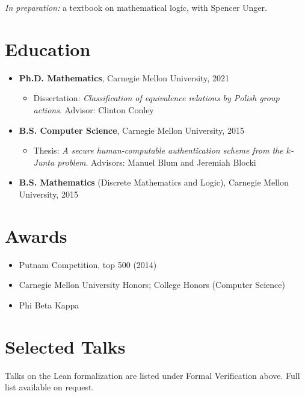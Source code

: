 \documentclass[letterpaper]{article}
\begin{document}
\smallskip
\emph{In preparation:} a textbook on mathematical logic, with Spencer Unger.

\section*{Education}

\begin{itemize}
  \item \textbf{Ph.D. Mathematics}, Carnegie Mellon University, 2021
  \begin{itemize}
    \item Dissertation: \emph{Classification of equivalence relations by
          Polish group actions}. Advisor: Clinton Conley
  \end{itemize}
  \item \textbf{B.S. Computer Science}, Carnegie Mellon University, 2015
  \begin{itemize}
    \item Thesis: \emph{A secure human-computable authentication scheme from
          the $k$-Junta problem}. Advisors: Manuel Blum and Jeremiah Blocki
  \end{itemize}
  \item \textbf{B.S. Mathematics} (Discrete Mathematics and Logic),
        Carnegie Mellon University, 2015
\end{itemize}

\section*{Awards}

\begin{itemize}
  \item Putnam Competition, top 500 (2014)
  \item Carnegie Mellon University Honors; College Honors (Computer Science)
  \item Phi Beta Kappa
\end{itemize}

\section*{Selected Talks}

Talks on the Lean formalization are listed under Formal Verification above.
Full list available on request.
\end{document}
